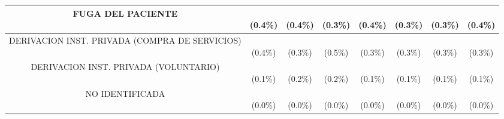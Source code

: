 \begin{table}[htbp]
\begin{tabular}{|c|c|c|c|c|c|c|c|}
\parbox[t]{4.0cm}{\raggedright FUGA DEL PACIENTE} & \parbox[t]{1.2cm}{\\(0.4\%)} & \parbox[t]{1.2cm}{\\(0.4\%)} & \parbox[t]{1.2cm}{\\(0.3\%)} & \parbox[t]{1.2cm}{\\(0.4\%)} & \parbox[t]{1.2cm}{\\(0.3\%)} & \parbox[t]{1.2cm}{\\(0.3\%)} & \parbox[t]{1.6cm}{\\(0.4\%)} \\ \hline
\parbox[t]{4.0cm}{\raggedright DERIVACION INST. PRIVADA (COMPRA DE SERVICIOS)} & \parbox[t]{1.2cm}{\\(0.4\%)} & \parbox[t]{1.2cm}{\\(0.3\%)} & \parbox[t]{1.2cm}{\\(0.5\%)} & \parbox[t]{1.2cm}{\\(0.3\%)} & \parbox[t]{1.2cm}{\\(0.3\%)} & \parbox[t]{1.2cm}{\\(0.3\%)} & \parbox[t]{1.6cm}{\\(0.3\%)} \\ \hline
\parbox[t]{4.0cm}{\raggedright DERIVACION INST. PRIVADA (VOLUNTARIO)} & \parbox[t]{1.2cm}{\\(0.1\%)} & \parbox[t]{1.2cm}{\\(0.2\%)} & \parbox[t]{1.2cm}{\\(0.2\%)} & \parbox[t]{1.2cm}{\\(0.1\%)} & \parbox[t]{1.2cm}{\\(0.1\%)} & \parbox[t]{1.2cm}{\\(0.1\%)} & \parbox[t]{1.6cm}{\\(0.1\%)} \\ \hline
\parbox[t]{4.0cm}{\raggedright NO IDENTIFICADA} & \parbox[t]{1.2cm}{\\(0.0\%)} & \parbox[t]{1.2cm}{\\(0.0\%)} & \parbox[t]{1.2cm}{\\(0.0\%)} & \parbox[t]{1.2cm}{\\(0.0\%)} & \parbox[t]{1.2cm}{\\(0.0\%)} & \parbox[t]{1.2cm}{\\(0.0\%)} & \parbox[t]{1.6cm}{\\(0.0\%)} \\ \hline

\end{tabular}
\end{table}
